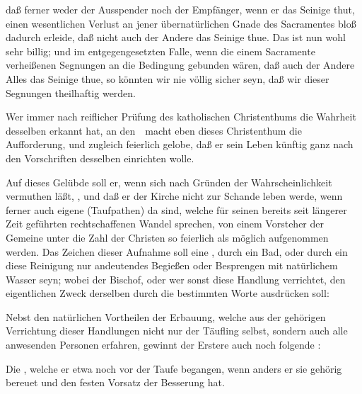 \begin{aufza}
\begin{RWanm}
\begin{aufzb}
\item daß ferner weder der Ausspender noch der Empfänger, wenn er das Seinige thut, einen wesentlichen Verlust an jener übernatürlichen Gnade des Sacramentes bloß dadurch erleide, daß nicht auch der Andere das Seinige thue. Das ist nun wohl sehr billig; und im entgegengesetzten Falle, wenn die einem Sacramente verheißenen Segnungen an die Bedingung gebunden wären, daß auch der Andere Alles das Seinige thue, so könnten wir nie völlig sicher seyn, daß wir dieser Segnungen theilhaftig werden. 
\end{aufzb}
\end{RWanm}
\end{aufza}

\begin{aufza}
\item Wer immer nach reiflicher Prüfung des katholischen Christenthums die Wahrheit desselben erkannt hat, an den~\ macht eben dieses Christenthum die Aufforderung,  und zugleich feierlich gelobe, daß er sein Leben künftig ganz nach den Vorschriften desselben einrichten wolle.
\item Auf dieses Gelübde soll er, wenn sich nach Gründen der Wahrscheinlichkeit vermuthen läßt, , und daß er der Kirche nicht zur Schande leben werde, wenn ferner auch eigene  (Taufpathen) da sind, welche für seinen bereits seit längerer Zeit geführten rechtschaffenen Wandel sprechen, von einem Vorsteher der Gemeine unter die Zahl der Christen so feierlich als möglich aufgenommen werden. Das Zeichen dieser Aufnahme soll eine , durch ein Bad, oder durch ein diese Reinigung nur andeutendes Begießen oder Besprengen mit natürlichem Wasser seyn; wobei der Bischof, oder wer sonst diese Handlung verrichtet, den eigentlichen Zweck derselben durch die bestimmten Worte ausdrücken soll: 
\item Nebst den natürlichen Vortheilen der Erbauung, welche aus der gehörigen Verrichtung dieser Handlungen nicht nur der Täufling selbst, sondern auch alle anwesenden Personen erfahren, gewinnt der Erstere auch noch folgende :
\begin{aufzb}
\item Die , welche er etwa noch vor der Taufe begangen, wenn anders er sie gehörig bereuet und den festen Vorsatz der Besserung hat.

\end{aufzb}
\end{aufza}
